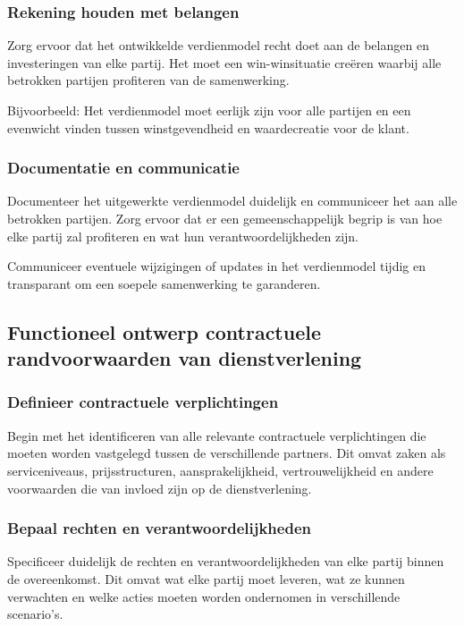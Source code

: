 \subsubsection{Rekening houden met belangen}
Zorg ervoor dat het ontwikkelde verdienmodel recht doet aan de belangen en investeringen van elke partij. Het moet een win-winsituatie creëren waarbij alle betrokken partijen profiteren van de samenwerking.

Bijvoorbeeld: Het verdienmodel moet eerlijk zijn voor alle partijen en een evenwicht vinden tussen winstgevendheid en waardecreatie voor de klant.

\subsubsection{Documentatie en communicatie}
Documenteer het uitgewerkte verdienmodel duidelijk en communiceer het aan alle betrokken partijen. Zorg ervoor dat er een gemeenschappelijk begrip is van hoe elke partij zal profiteren en wat hun verantwoordelijkheden zijn.

Communiceer eventuele wijzigingen of updates in het verdienmodel tijdig en transparant om een soepele samenwerking te garanderen.

\subsection{Functioneel ontwerp contractuele randvoorwaarden van dienstverlening}

\subsubsection{Definieer contractuele verplichtingen}
Begin met het identificeren van alle relevante contractuele verplichtingen die moeten worden vastgelegd tussen de verschillende partners. Dit omvat zaken als serviceniveaus, prijsstructuren, aansprakelijkheid, vertrouwelijkheid en andere voorwaarden die van invloed zijn op de dienstverlening.

\subsubsection{Bepaal rechten en verantwoordelijkheden}
Specificeer duidelijk de rechten en verantwoordelijkheden van elke partij binnen de overeenkomst. Dit omvat wat elke partij moet leveren, wat ze kunnen verwachten en welke acties moeten worden ondernomen in verschillende scenario's.

